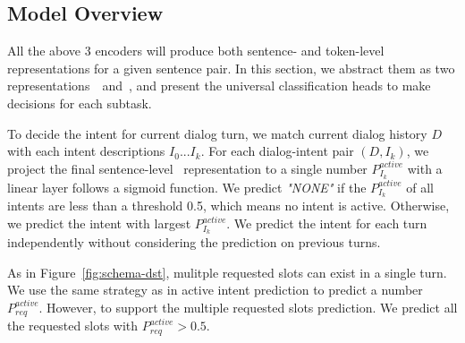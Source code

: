 \subsection{Model Overview}
\label{ssec:models-overview}
All the above 3 encoders will produce both sentence- and token-level
representations for a given sentence pair. In this section,
we abstract them as two representations~\CLS~and~\TOK, and present the
universal classification heads to make decisions for each subtask.

 To decide the intent for current dialog
turn, we match current dialog history $D$ with each intent
descriptions $I_{0}...I_{k}$. For each dialog-intent pair $(D,I_{k})$,
we project the final sentence-level \CLS~representation to a single
number $P_{I_{k}}^{active}$ with a linear layer follows a sigmoid
function. We predict \textit{"NONE"} if the $P_{I_{k}}^{active}$ of
all intents are less than a threshold 0.5, which means no intent is
active. Otherwise, we predict the intent with largest
$P_{I_{k}}^{active}$. We predict the intent for each turn
independently without considering the prediction on previous turns.

 As in Figure~\ref{fig:schema-dst},
mulitple requested slots can exist in a single turn. We use the
same strategy as in active intent prediction to predict a number
$P_{req}^{active}$. However, to support the multiple requested slots
prediction. We predict all the requested slots with
$P_{req}^{active} > 0.5$.


